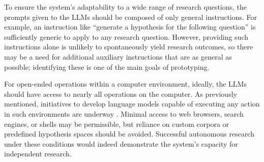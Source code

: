 To ensure the system's adaptability to a wide range of research questions, the prompts given to the LLMs should be composed of only general instructions. For example, an instruction like ``generate a hypothesis for the following question'' is sufficiently generic to apply to any research question. However, providing such instructions alone is unlikely to spontaneously yield research outcomes, so there may be a need for additional auxiliary instructions that are as general as possible; identifying these is one of the main goals of prototyping.

For open-ended operations within a computer environment, ideally, the LLMs should have access to nearly all operations on the computer. As previously mentioned, initiatives to develop language models capable of executing any action in such environments are underway \cite{openai_chatgpt_plugins_code_interpreter_2023,openinterpreter}. Minimal access to web browsers, search engines, or shells may be permissible, but reliance on custom corpora or predefined hypothesis spaces should be avoided. Successful autonomous research under these conditions would indeed demonstrate the system's capacity for independent research.




